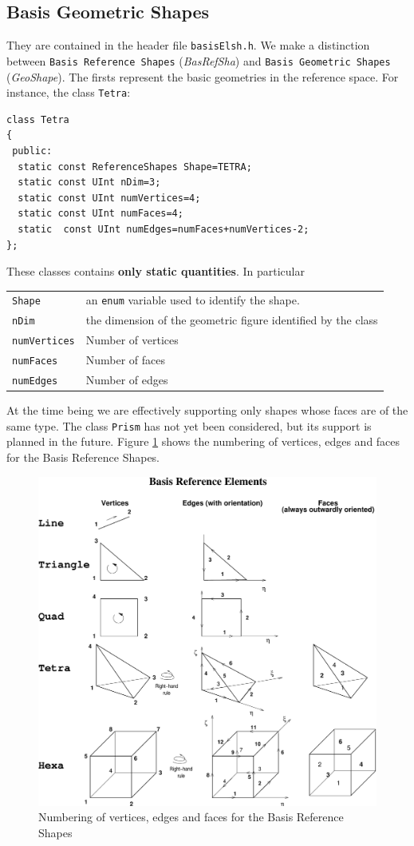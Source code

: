 \subsection{Basis Geometric Shapes}
\label{sec:basgeosha}
They are contained in the header file \texttt{basisElsh.h}.  We make a
distinction between \texttt{Basis Reference Shapes} (\emph{BasRefSha})
and \texttt{Basis Geometric Shapes} (\emph{GeoShape}). The firsts
represent the basic geometries in the reference space. For instance,
the class \texttt{Tetra}:
\begin{verbatim}
class Tetra
{
 public:
  static const ReferenceShapes Shape=TETRA;
  static const UInt nDim=3;
  static const UInt numVertices=4;
  static const UInt numFaces=4;
  static  const UInt numEdges=numFaces+numVertices-2;
};
\end{verbatim}
These classes contains \textbf{only static quantities}.
In particular

\begin{tabularx}{\textwidth}{lX}
\hline
\texttt{Shape} & an \texttt{enum} variable used to identify the shape.\\
\texttt{nDim}  & the dimension of the geometric figure identified by the class\\
\texttt{numVertices} & Number of vertices\\
\texttt{numFaces} & Number of faces\\
\texttt{numEdges} & Number of edges\\
\hline
\end{tabularx}

At the time being we are effectively supporting only shapes whose
faces are of the same type. The class \texttt{Prism} has not yet been considered,
but its support is planned in the future.
Figure \ref{fig:basrefsha} shows the numbering of vertices, edges and faces
for the Basis Reference Shapes.
\begin{figure}[hbp]
  \begin{center}
    \includegraphics[width=.7\linewidth]{BasElSha}
    
  \end{center}
  \caption{Numbering of vertices, edges and faces
    for the Basis Reference Shapes}\label{fig:basrefsha}
\end{figure}

